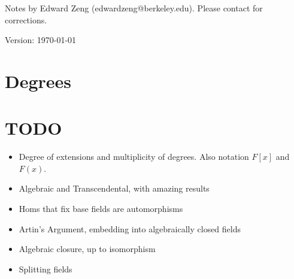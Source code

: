 \def\topic{Field Extensions}



    \begin{center}
        \color{blue}
        \textsf{Notes by Edward Zeng (edwardzeng@berkeley.edu). Please contact for corrections.}

        \color{red}
        \textsf{Version: \today}
    \end{center}

    

    \section{Degrees}

    \newpage
    
    

    \newpage
    

    \newpage
    

    \newpage
    \section{TODO}
    \begin{itemize}
        \item Degree of extensions and multiplicity of degrees. Also notation $F[x]$ and $F(x)$.
        \item Algebraic and Transcendental, with amazing results
        \item Homs that fix base fields are automorphisms
        \item Artin's Argument, embedding into algebraically closed fields
        \item Algebraic closure, up to isomorphism
        \item Splitting fields
    \end{itemize}


